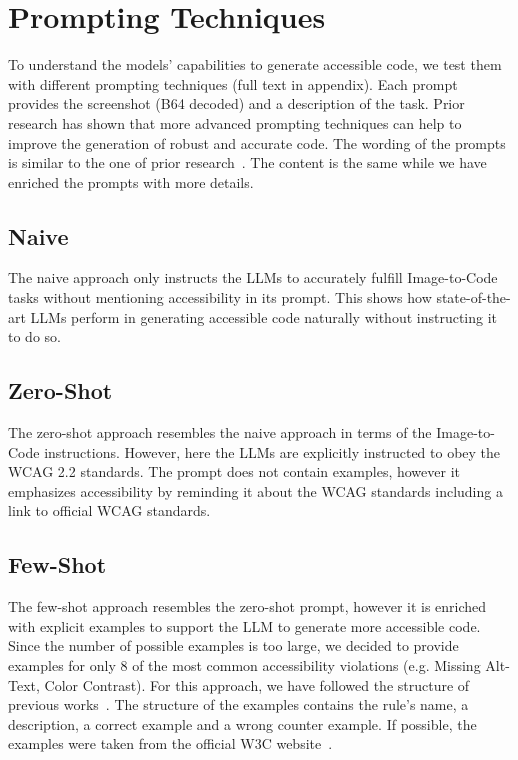 \section{Prompting Techniques}
To understand the models' capabilities to generate accessible code, we test
them with different prompting techniques (full text in appendix). Each 
prompt provides the screenshot (B64 decoded) and a description of the
task.\newline
Prior research has shown that more 
advanced prompting techniques can help to improve the generation of robust and 
accurate code.
The wording of the prompts is similar to the one of prior research~\parencite{suh2025accessiblecode, xiao2024interaction2code}.
The content is the same while we have enriched the prompts with more details.\newline

\subsection{Naive}
The naive approach only instructs the LLMs to accurately fulfill Image-to-Code tasks
without mentioning accessibility in its prompt. This shows how state-of-the-art 
LLMs perform in generating accessible code naturally without instructing it to 
do so.

\subsection{Zero-Shot}
The zero-shot approach resembles the naive approach in terms of the Image-to-Code
instructions. However, here the LLMs are explicitly instructed to obey the WCAG 
2.2 standards. The prompt does not contain examples, however it emphasizes 
accessibility by reminding it about the WCAG standards including a link to 
official WCAG standards.

\subsection{Few-Shot}
The few-shot approach resembles the zero-shot prompt, however it is enriched with 
explicit examples to support the LLM to generate more accessible code. 
Since the number of possible examples is too large, we decided to provide examples 
for only 8 of the most common accessibility violations (e.g. Missing Alt-Text, 
Color Contrast). 
For this approach, we have followed the structure of previous 
works~\parencite{suh2025accessiblecode}.
The structure of the examples contains the rule's name, a description, a
correct example and a wrong counter example. If possible, the examples 
were taken from the official W3C website~\parencite{wcag21}.

